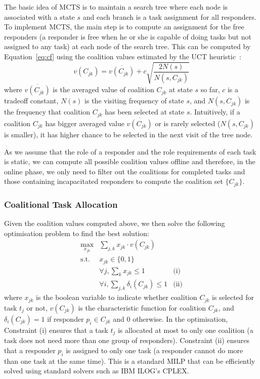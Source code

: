 The basic idea of MCTS is to maintain a search tree where each node
is associated with a state $s$ and each branch is a task assignment
for all responders. To implement MCTS, the main step is to compute
an assignment for the free responders (a responder is free when he
or she is capable of doing tasks but not assigned to any task) at
each node of the search tree. This can be computed by
Equation~\ref{eq:cf} using the coalition values estimated by the
UCT heuristic~\cite{?}:
\begin{equation}
  v(C_{jk}) = \overline{v(C_{jk})} + c\sqrt{\frac{2N(s)}{N(s, C_{jk})}}
\end{equation}
where $\overline{v(C_{jk})}$ is the averaged value of coalition
$C_{jk}$ at state $s$ so far, $c$ is a tradeoff constant, $N(s)$ is
the visiting frequency of state $s$, and $N(s, C_{jk})$ is the
frequency that coalition $C_{jk}$ has been selected at state $s$.
Intuitively, if a coalition $C_{jk}$ has bigger averaged value
$\overline{v(C_{jk})}$ or is rarely selected ($N(s, C_{jk})$ is
smaller), it has higher chance to be selected in the next visit of
the tree node.

As we assume that the role of a responder and the role requirements
of each task is static, we can compute all possible coalition
values offline and therefore, in the online phase, we only need to
filter out the coalitions for completed tasks and those containing
incapacitated responders to compute the coalition set $\{ C_{jk}
\}$.

\subsubsection{Coalitional Task Allocation}
Given the coalition values computed above, we then solve the following
optimisation problem to find the best solution:
\begin{equation}
  \begin{array}{lll}
    \max\limits_{x_{jk}} & \sum_{j, k} x_{jk} \cdot v(C_{jk}) & \\[2pt]
    \mbox{s.t.} & x_{jk} \in \{0, 1\} & \\[2pt]
    & \forall j, \sum_{k} x_{jk} \leq 1 & \mbox{(i)} \\[2pt]
    & \forall i, \sum_{j, k} \delta_i(C_{jk}) \leq 1 & \mbox{(ii)}
  \end{array}
  \label{eq:cf}
\end{equation}
where $x_{jk}$ is the boolean variable to indicate whether
coalition $C_{jk}$ is selected for task $t_j$ or not, $v(C_{jk})$
is the characteristic function for coalition $C_{jk}$, and
$\delta_i(C_{jk}) = 1$ if responder $p_i\in C_{jk}$ and 0
otherwise. In the optimisation, Constraint (i) ensures that a task
$t_j$ is allocated at most to only one coalition (a task does not
need more than one group of responders). Constraint (ii) ensures
that a responder $p_i$ is assigned to only one task (a responder
cannot do more than one task at the same time). This is a standard
MILP that can be efficiently solved  using standard solvers such as
IBM ILOG's CPLEX.

